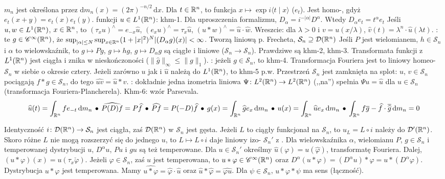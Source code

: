   $m_n$ jest określona przez $\textrm{d}m_n(x) = (2\pi)^{-n/2}\,\textrm{d}x$.
Dla $t \in \mathbb{R}^n$,  to funkcja $x \mapsto \exp i \langle t \mid x \rangle$ ($e_t$).
Jest homo-, gdyż $e_t(x+y) = e_t(x)e_t(y)$.
 funkcji $u \in L^1(\mathbb{R}^n)$: khm-1.
Dla uproszczenia formalizmu, $D_\alpha = i^{-|\alpha|} D^\alpha$.
Wtedy $D_\alpha e_t = t^\alpha e_t$
Jeśli $u, w\in L^1(\mathbb{R}^n)$, $x \in \mathbb{R}^n$, to $(\tau_x u)^\wedge = e_{-x} \widehat{u}$, $(e_x u)^\wedge = \tau_x \widehat u$, $(u * w)^\wedge = \widehat{u} \cdot \widehat{w}$.
Wreszcie: dla $\lambda > 0$ i $v = u(x/\lambda)$, $\widehat{v}(t) = \lambda^n \cdot \widehat{u}(\lambda t)$.
: te $g \in \mathscr C^\infty (\mathbb{R}^n)$, że $\sup_{|\alpha| \le N} \sup_{x \in \mathbb{R}^n} (1+|x|^2)^N |(D_\alpha g)(x)| < \infty$.
Tworzą liniową p. Frecheta, $\mathcal S_n \supseteq \mathcal D(\mathbb{R}^n)$
Jeśli $P$ jest wielomianem, $h \in \mathcal S_n$ i $\alpha$ to wielowskaźnik, to $g \mapsto Pg$, $g \mapsto hg$, $g \mapsto D_\alpha g$ są ciągłe i liniowe ($\mathcal S_n \to \mathcal S_n$).
Prawdziwe są khm-2, khm-3.
Transformata funkcji z $L^1(\mathbb{R}^n)$ jest ciągła i znika w nieskończoności ($\|\widehat g\|_\infty \le \|g\|_1$).
: jeżeli $g \in \mathcal S_n$, to khm-4.
Transformacja Fouriera jest to liniowy homeo- $\mathcal S_n$ w siebie o okresie cztery.
Jeżeli zarówno $u$ jak i $\widehat u$ należą do $L^1(\mathbb{R}^n)$, to khm-5 p.w.
Przestrzeń $\mathcal S_n$ jest zamknięta na splot: $u$, $v \in \mathcal S_n$ pociągają $f * g \in \mathcal S_n$, do tego $\widehat{uv} = \widehat u * \widehat v$.
: dokładnie jedna izometria liniowa $\Psi \colon L^2(\mathbb{R}^n) \to L^2(\mathbb{R}^n)$ (,,na'') spełnia $\Psi u = \widehat u$ dla $u \in \mathcal S_n$ (transformacja Fouriera-Plancherela).
Khm-6: wzór Parsevala.
\[
	\widehat u(t) = \int_{\mathbb{R}^n} f e_{-t} \,\textrm{d} m_n \, \bullet \,
	\widehat{P(D)f} = P \widehat f \, \bullet \,
	\widehat{Pf} = P(-D) \widehat f \, \bullet \,
	g(x) = \int_{\mathbb{R}^n} \widehat g e_x \,\textrm{d} m_n \, \bullet \,
	u(x) = \int_{\mathbb{R}^n} \widehat u e_x \,\textrm{d} m_n \, \bullet \,
	\int_{\mathbb{R}^n} f \overline g -\widehat f \cdot \overline {\widehat g} \,\textrm{d} m_n = 0
\]

Identyczność  $i \colon \mathcal D(\mathbb{R}^n) \to \mathcal S_n$ jest ciągła, zaś $\mathcal D(\mathbb{R}^n)$ w $\mathcal S_n$ jest gęsta.
Jeżeli $L$ to ciągły funkcjonał na $\mathcal S_n$, to $u_L = L \circ i$ należy do $\mathcal D'(\mathbb{R}^n)$.
Skoro różne $L$ nie mogą rozszerzyć się do jednego $u$, to $L \mapsto L \circ i$ daje liniowy izo- $\mathcal S_n'$ z .
Dla wielowskaźnika $\alpha$, wielomianu $P$, $g\in \mathcal S_n$ i temperowanej dystrybucji $u$, $D^\alpha u$, $Pu$ i $gu$ są też temperowane.
Dla $u \in \mathcal S_n'$ określmy $\widehat u (\varphi) = u(\widehat \varphi)$, transformatę Fouriera.
Dalej, $(u * \varphi)(x) = u(\tau_x \check \varphi)$.
Jeżeli $\varphi \in \mathcal S_n$, zaś $u$ jest temperowana, to $u * \varphi \in \mathscr C^\infty(\mathbb{R}^n)$ oraz $D^\alpha(u * \varphi) = (D^\alpha u) * \varphi = u * (D^\alpha \varphi)$.
Dystrybucja $u * \varphi$ jest temperowana.
Mamy $\widehat{u * \varphi} = \widehat \varphi \cdot \widehat u$ oraz $\widehat u * \widehat \varphi = \widehat {\varphi u}$.
Dla $\psi \in \mathcal S_n$, $u * \varphi * \psi$ ma sens (łączność).


